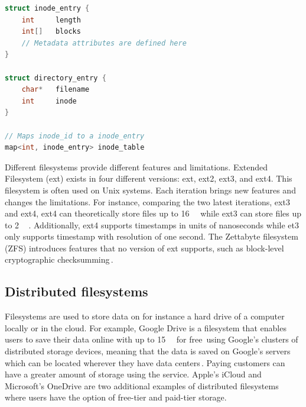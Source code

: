 \begin{minipage}{\linewidth}
\begin{lstlisting}[language=c, caption={Pseudocode of a minimalistic inode filesystem structure}, label=lst:inode_fs]
struct inode_entry {
	int 	length
	int[]	blocks
	// Metadata attributes are defined here
}

struct directory_entry {
	char*   filename
	int     inode
}

// Maps inode_id to a inode_entry
map<int, inode_entry> inode_table

\end{lstlisting}
\end{minipage}

Different filesystems provide different features and limitations. Extended Filesystem (ext) exists in four different versions: ext, ext2, ext3, and ext4. This filesystem is often used on Unix systems. Each iteration brings new features and changes the limitations. For instance, comparing the two latest iterations, ext3 and ext4, ext4 can theoretically store files up to \SI{16}{\tebi\byte} while ext3 can store files up to \SI{2}{\tebi\byte}\,\cite{salterUnderstandingLinuxFilesystems2018}. Additionally, ext4 supports timestamps in units of nanoseconds while et3 only supports timestamp with resolution of one second. The Zettabyte filesystem (ZFS) introduces features that no version of ext supports, such as block-level cryptographic checksumming\,\cite{salterUnderstandingLinuxFilesystems2018}.



\subsection{Distributed filesystems}
Filesystems are used to store data on for instance a hard drive of a computer locally or in the cloud. For example, Google Drive is a filesystem that enables users to save their data online with up to \SI{15}{\giga\byte} for free\,\cite{CloudStorageWork} using Google's clusters of distributed storage devices, meaning that the data is saved on Google's servers which can be located wherever they have data centers\,\cite{DistributedStorageWhat}. Paying customers can have a greater amount of storage using the service. Apple's iCloud and Microsoft's OneDrive are two additional examples of distributed filesystems where users have the option of free-tier and paid-tier storage.

